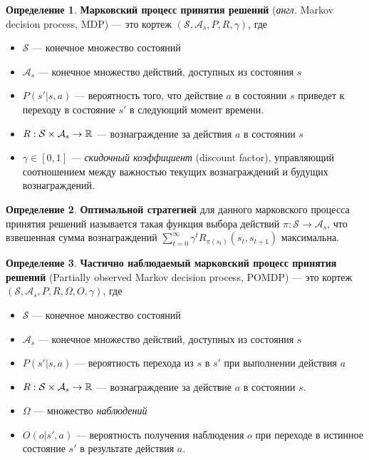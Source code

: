 \documentclass[specification,annotation,times]{itmo-student-thesis}
\theoremstyle{definition}
\newtheorem{definition-ru}{Определение}
\begin{document}
\begin{definition-ru}
  \textbf{Марковский процесс принятия решений} (\textit{англ.} Markov decision process, MDP) ---
  это кортеж
  $(\mathcal{S}, \mathcal{A}_s, P, R, \gamma)$, где

  \begin{itemize}
  \item $\mathcal{S}$ --- конечное множество состояний
  \item $\mathcal{A}_s$ --- конечное множество действий, доступных из состояния
    $s$
  \item $P(s' | s, a)$ --- вероятность того, что действие $a$ в состоянии $s$
    приведет к переходу в состояние $s'$ в следующий момент времени.
  \item $R : \mathcal{S} \times \mathcal{A}_s \rightarrow \Bbb{R}$ ---
    вознаграждение за действия $a$ в состоянии $s$
  \item $\gamma \in [0, 1]$ --- \textit{скидочный коэффициент} (discount factor),
    управляющий соотношением между важностью текущих вознаграждений и будущих вознаграждений.
  \end{itemize}
\end{definition-ru}

\begin{definition-ru}
  \textbf{Оптимальной стратегией} для данного марковского процесса принятия
  решений называется такая функция выбора действий $\pi : \mathcal{S} \rightarrow \mathcal{A}_s$,
  что взвешенная сумма вознаграждений $\sum\limits_{t=0}^{\infty} {\gamma^t
    R_{\pi(s_t)}(s_t, s_{t+1})}$ максимальна.
\end{definition-ru}

\begin{definition-ru}
  \textbf{Частично наблюдаемый марковский процесс принятия решений} (Partially
  observed Markov decision process, POMDP) --- это кортеж
  $(\mathcal{S}, \mathcal{A}_s, P, R, \Omega, O, \gamma)$, где
  \begin{itemize}
  \item $\mathcal{S}$ --- конечное множество состояний
  \item $\mathcal{A}_s$ --- конечное множество действий, доступных из состояния $s$
  \item $P(s' | s, a)$ --- вероятность перехода из $s$ в $s'$ при выполнении
    действия $a$
  \item $R : \mathcal{S} \times \mathcal{A}_s \rightarrow \Bbb{R}$ ---
    вознаграждение за действие $a$ в состоянии $s$.
  \item $\Omega$ --- множество \textit{наблюдений}
  \item $O(o | s', a)$ --- вероятность получения наблюдения $o$ при переходе в
    истинное состояние $s'$ в результате действия $a$. 
  \end{itemize}
\end{definition-ru}
\end{document}
